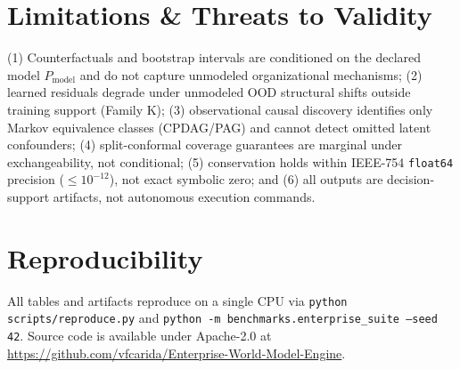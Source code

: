 \documentclass[11pt,a4paper]{article}
\begin{document}
\section{Limitations \& Threats to Validity}
(1) Counterfactuals and bootstrap intervals are conditioned on the declared model $P_{\text{model}}$ and do not capture unmodeled organizational mechanisms; (2) learned residuals degrade under unmodeled OOD structural shifts outside training support (Family K); (3) observational causal discovery identifies only Markov equivalence classes (CPDAG/PAG) and cannot detect omitted latent confounders; (4) split-conformal coverage guarantees are marginal under exchangeability, not conditional; (5) conservation holds within IEEE-754 \texttt{float64} precision ($\le 10^{-12}$), not exact symbolic zero; and (6) all outputs are decision-support artifacts, not autonomous execution commands.

\section{Reproducibility}
All tables and artifacts reproduce on a single CPU via \texttt{python scripts/reproduce.py} and \texttt{python -m benchmarks.enterprise\_suite --seed 42}. Source code is available under Apache-2.0 at \url{https://github.com/vfcarida/Enterprise-World-Model-Engine}.



\end{document}
